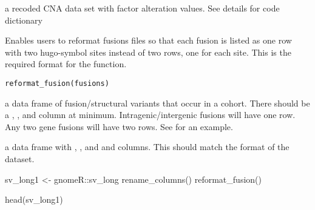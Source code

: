 \documentclass[a4paper]{book}
\begin{document}
%
\begin{Value}
a recoded CNA data set with factor alteration values. See details for code dictionary
\end{Value}
%
\begin{Examples}
\end{Examples}
%
\begin{Description}\relax
Enables users to reformat fusions files so that each fusion is listed as one row with two hugo-symbol
sites instead of two rows, one for each site. This is the required format for the  function.
\end{Description}
%
\begin{Usage}
\begin{verbatim}
reformat_fusion(fusions)
\end{verbatim}
\end{Usage}
%
\begin{Arguments}
\begin{ldescription}
\item[\code{fusions}] a data frame of fusion/structural variants that occur in a cohort. There should be a , ,
and  column at minimum. Intragenic/intergenic fusions will have one row. Any two gene fusions will
have two rows. See  for an example.
\end{ldescription}
\end{Arguments}
%
\begin{Value}
a data frame with , , and  and  columns. This should match the format
of the  dataset.
\end{Value}
%
\begin{Examples}
\begin{ExampleCode}

sv_long1 <- gnomeR::sv_long %
  rename_columns() %
  reformat_fusion()

head(sv_long1)

\end{ExampleCode}
\end{Examples}
\end{document}
